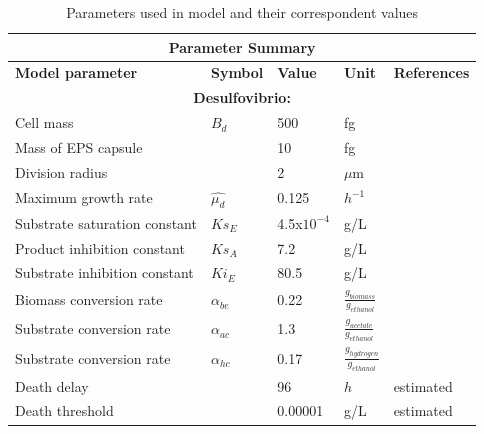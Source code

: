 \begin{table}
\caption{ Parameters used in model and their correspondent values}
\smallskip
	
	
	\def\arraystretch{1.0}%
	\setlength{\tabcolsep}{1em}
	\begin{tabular}{|p{5cm}|p{1.2 cm}|p{1.2cm}|p{1.2cm}|p{3cm}|}
		\hline
		\multicolumn{5}{|c|}{	\textbf{Parameter Summary}} \\
		\hline
		\textbf{Model parameter   } & \textbf{Symbol } 	&	\textbf{ Value }& 	\textbf{Unit}& 	\textbf{References}\\
		\hline

        \multicolumn{5}{|c|}{\textbf{Desulfovibrio:}} \\
		\cline{1-5}
		Cell mass   & $ B_{d}$&	500 & fg& \cite{kubitschek1990cell} \\ \cline{1-5}
        Mass of EPS capsule   & &	10&fg&\cite{}\\ \cline{1-5}
		Division radius  & 	&2&$\mu$m &\cite{}\\ \cline{1-5}
		Maximum growth rate	& $\hat{\mu_{d}}$ & 0.125& $h^{-1}$&\cite{} \\ \cline{1-5}
		Substrate saturation constant& $ Ks_{E} $ &	4.5x$10^{-4}$&g/L&\cite{}  \\ \cline{1-5}
        Product inhibition constant& $ Ks_{A} $ &	7.2&g/L&\cite{}  \\ \cline{1-5}
        Substrate inhibition constant& $ Ki_{E} $ &	80.5&g/L&\cite{}  \\ \cline{1-5}
		Biomass conversion rate& $ \alpha_{be}$	&0.22& $\frac{g_{biomass}}{g_{ethanol}}$&\cite{}  \\ \cline{1-5}
		Substrate conversion rate&$ \alpha_{ac}$&	1.3& $\frac{g_{acetate}}{g_{ethanol}}$&\cite{}  \\ \cline{1-5}
        Substrate conversion rate&$ \alpha_{hc}$&	0.17& $\frac{g_{hydrogen}}{g_{ethanol}}$&\cite{}  \\ \cline{1-5}
        Death delay&	&96 & $h$& estimated\\ \cline{1-5}
		Death threshold&	&0.00001 & g/L& estimated\\ \cline{1-5}
		

\end{tabular}
\end{table}
